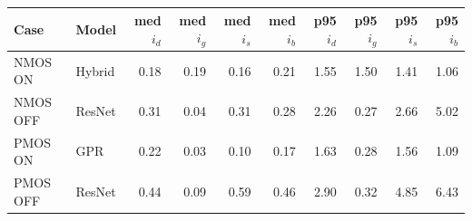 \begin{tabular}{llrrrrrrrr}
\toprule
Case & Model & med $i_d$ & med $i_g$ & med $i_s$ & med $i_b$ & p95 $i_d$ & p95 $i_g$ & p95 $i_s$ & p95 $i_b$ \\
\midrule
NMOS ON & Hybrid & 0.18 & 0.19 & 0.16 & 0.21 & 1.55 & 1.50 & 1.41 & 1.06 \\
NMOS OFF & ResNet & 0.31 & 0.04 & 0.31 & 0.28 & 2.26 & 0.27 & 2.66 & 5.02 \\
PMOS ON & GPR & 0.22 & 0.03 & 0.10 & 0.17 & 1.63 & 0.28 & 1.56 & 1.09 \\
PMOS OFF & ResNet & 0.44 & 0.09 & 0.59 & 0.46 & 2.90 & 0.32 & 4.85 & 6.43 \\
\bottomrule
\end{tabular}
